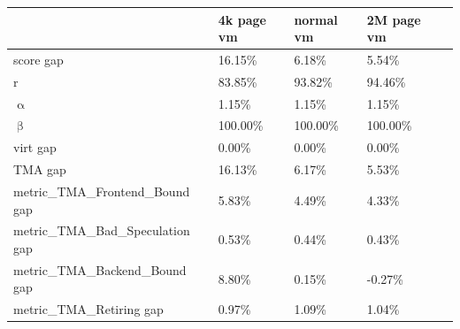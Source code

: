 \documentclass[12pt]{article}
\begin{document}
\noindent\hspace*{26.75pt}\begin{tabular}{|b{156.20pt}|b{72.70pt}|b{80.70pt}|b{82.95pt}|@{}b{0pt}@{}}
\hline
\centering\arraybackslash{} & \centering\arraybackslash{}4k page vm & \centering\arraybackslash{}normal vm & \centering\arraybackslash{}2M page vm & \rule[-0.00pt]{0pt}{12.25pt} \\ \hline
\centering\arraybackslash{}score gap & \centering\arraybackslash{}16.15\% & \centering\arraybackslash{}6.18\% & \centering\arraybackslash{}5.54\% & \rule[-0.00pt]{0pt}{12.25pt} \\ \hline
\centering\arraybackslash{}r & \centering\arraybackslash{}83.85\% & \centering\arraybackslash{}93.82\% & \centering\arraybackslash{}94.46\% & \rule[-0.00pt]{0pt}{12.25pt} \\ \hline
\centering\arraybackslash{}\ensuremath{\upalpha} & \centering\arraybackslash{}1.15\% & \centering\arraybackslash{}1.15\% & \centering\arraybackslash{}1.15\% & \rule[-0.00pt]{0pt}{12.25pt} \\ \hline
\centering\arraybackslash{}\ensuremath{\upbeta} & \centering\arraybackslash{}100.00\% & \centering\arraybackslash{}100.00\% & \centering\arraybackslash{}100.00\% & \rule[-0.00pt]{0pt}{12.25pt} \\ \hline
\centering\arraybackslash{}virt gap & \centering\arraybackslash{}0.00\% & \centering\arraybackslash{}0.00\% & \centering\arraybackslash{}0.00\% & \rule[-0.00pt]{0pt}{12.25pt} \\ \hline
\centering\arraybackslash{}TMA gap & \centering\arraybackslash{}16.13\% & \centering\arraybackslash{}6.17\% & \centering\arraybackslash{}5.53\% & \rule[-0.00pt]{0pt}{12.25pt} \\ \hline
\cellcolor[HTML]{F8CBAD}\centering\arraybackslash{}metric\_\allowbreak{}TMA\_\allowbreak{}Frontend\_\allowbreak{}Bound gap & \cellcolor[HTML]{F8CBAD}\centering\arraybackslash{}5.83\% & \cellcolor[HTML]{F8CBAD}\centering\arraybackslash{}4.49\% & \cellcolor[HTML]{F8CBAD}\centering\arraybackslash{}4.33\% & \rule[-0.00pt]{0pt}{12.25pt} \\ \hline
\centering\arraybackslash{}metric\_\allowbreak{}TMA\_\allowbreak{}Bad\_\allowbreak{}Speculation gap & \centering\arraybackslash{}0.53\% & \centering\arraybackslash{}0.44\% & \centering\arraybackslash{}0.43\% & \rule[-0.00pt]{0pt}{12.25pt} \\ \hline
\cellcolor[HTML]{F8CBAD}\centering\arraybackslash{}metric\_\allowbreak{}TMA\_\allowbreak{}Backend\_\allowbreak{}Bound gap & \cellcolor[HTML]{F8CBAD}\centering\arraybackslash{}8.80\% & \cellcolor[HTML]{F8CBAD}\centering\arraybackslash{}0.15\% & \cellcolor[HTML]{F8CBAD}\centering\arraybackslash{}-0.27\% & \rule[-0.00pt]{0pt}{12.25pt} \\ \hline
\centering\arraybackslash{}metric\_\allowbreak{}TMA\_\allowbreak{}Retiring gap & \centering\arraybackslash{}0.97\% & \centering\arraybackslash{}1.09\% & \centering\arraybackslash{}1.04\% & \rule[-0.00pt]{0pt}{12.25pt} \\ \hline
\end{tabular}\par\endgroup\par
\end{document}
